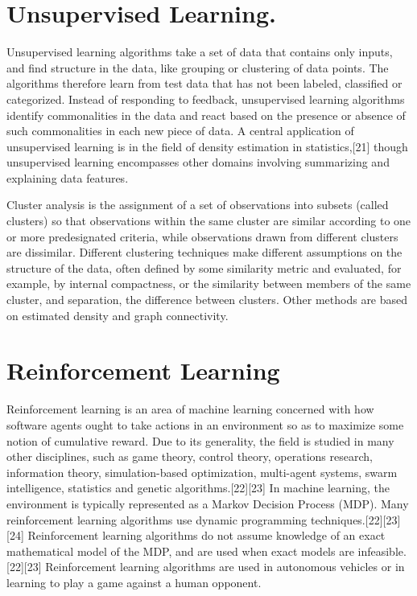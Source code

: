 \documentclass[utf8,bachelor,english]{gradu3}
\begin{document}
\section{Unsupervised Learning.}
Unsupervised learning algorithms take a set of data that contains only inputs, and find structure in the data, like grouping or clustering of data points. The algorithms therefore learn from test data that has not been labeled, classified or categorized. Instead of responding to feedback, unsupervised learning algorithms identify commonalities in the data and react based on the presence or absence of such commonalities in each new piece of data. A central application of unsupervised learning is in the field of density estimation in statistics,[21] though unsupervised learning encompasses other domains involving summarizing and explaining data features.

Cluster analysis is the assignment of a set of observations into subsets (called clusters) so that observations within the same cluster are similar according to one or more predesignated criteria, while observations drawn from different clusters are dissimilar. Different clustering techniques make different assumptions on the structure of the data, often defined by some similarity metric and evaluated, for example, by internal compactness, or the similarity between members of the same cluster, and separation, the difference between clusters. Other methods are based on estimated density and graph connectivity.

\section{Reinforcement Learning}
Reinforcement learning is an area of machine learning concerned with how software agents ought to take actions in an environment so as to maximize some notion of cumulative reward. Due to its generality, the field is studied in many other disciplines, such as game theory, control theory, operations research, information theory, simulation-based optimization, multi-agent systems, swarm intelligence, statistics and genetic algorithms.[22][23] In machine learning, the environment is typically represented as a Markov Decision Process (MDP). Many reinforcement learning algorithms use dynamic programming techniques.[22][23][24] Reinforcement learning algorithms do not assume knowledge of an exact mathematical model of the MDP, and are used when exact models are infeasible.[22][23] Reinforcement learning algorithms are used in autonomous vehicles or in learning to play a game against a human opponent.
\end{document}
